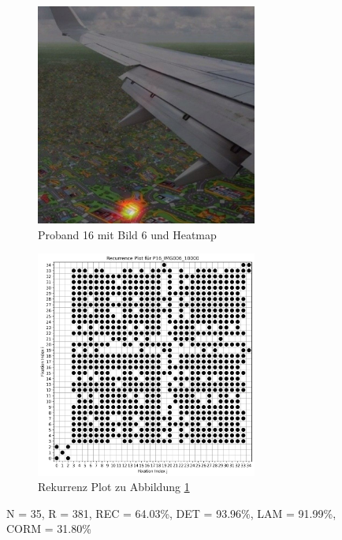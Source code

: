 \documentclass[
    language=german, %
    thesis=seminar, %
    supervisor=postdoc, %
    multiauthor=true, %
    ]{settings/csssa-thesis}
\begin{document}
\begin{figure}[ht]
    \centering
    \begin{subfigure}{0.49\textwidth}
        \centering
        \includegraphics[width=0.8\textwidth]{figures/Bild16.jpeg}
        \caption{Proband 16 mit Bild 6 und Heatmap}\label{fig:Bild14a}
    \end{subfigure}
    \begin{subfigure}{0.49\textwidth}
        \centering
        \includegraphics[width=0.8\textwidth]{figures/Bild17.jpeg}
        \caption{Rekurrenz Plot zu Abbildung \ref{fig:Bild14a}}\label{fig:Bild14b}
    \end{subfigure}\label{fig:Bild14}
    \caption{N = 35, R = 381, REC = 64.03\%, DET = 93.96\%, LAM = 91.99\%, CORM = 31.80\%}
\end{figure}
\end{document}
